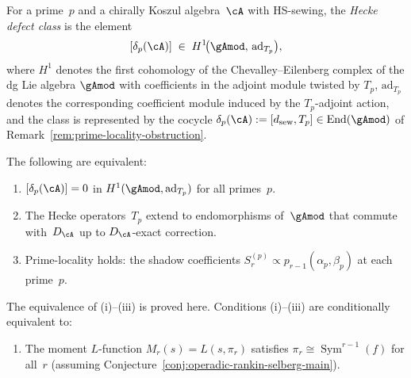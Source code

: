 \begin{definition}%
\label{def:hecke-defect-class}%
%
For a prime~$p$ and a chirally Koszul algebra~$\cA$ with
HS-sewing, the \emph{Hecke defect class} is the element
\begin{equation}\label{eq:hecke-defect-class}
 [\delta_p(\cA)]
 \;\in\;
 H^1\!\bigl(\gAmod,\,
 \mathrm{ad}_{T_p}\bigr),
\end{equation}
where $H^1$ denotes the first cohomology of the
Chevalley--Eilenberg complex of the dg Lie algebra $\gAmod$
with coefficients in the adjoint module twisted by $T_p$,
$\mathrm{ad}_{T_p}$ denotes the corresponding coefficient module
induced by the $T_p$-adjoint action, and the class is
represented by the cocycle
$\delta_p(\cA) := [d_{\mathrm{sew}}, T_p] \in
\mathrm{End}(\gAmod)$
of Remark~\textup{\ref{rem:prime-locality-obstruction}}.
\end{definition}

\begin{proposition}%
\label{prop:hecke-defect-equivalences}%
%
The following are equivalent:
\begin{enumerate}[label=\textup{(\roman*)}]
\item $[\delta_p(\cA)] = 0$ in
 $H^1(\gAmod, \mathrm{ad}_{T_p})$ for all primes~$p$.
\item The Hecke operators~$T_p$ extend to endomorphisms
 of~$\gAmod$ that commute with~$D_\cA$ up to
 $D_\cA$-exact correction.
\item Prime-locality holds: the shadow coefficients
 $S_r^{(p)} \propto p_{r-1}(\alpha_p,\beta_p)$ at
 each prime~$p$.
\end{enumerate}
The equivalence of \textup{(i)--(iii)} is proved here. Conditions
\textup{(i)--(iii)} are conditionally equivalent to\textup{:}
\begin{enumerate}[label=\textup{(\roman*)},resume]
\item The moment $L$-function $M_r(s) = L(s,\pi_r)$
 satisfies $\pi_r \cong \operatorname{Sym}^{r-1}(f)$
 for all~$r$
 \textup{(}assuming
 Conjecture~\textup{\ref{conj:operadic-rankin-selberg-main}}\textup{)}.
\end{enumerate}
\end{proposition}

